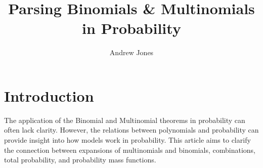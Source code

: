 \documentclass{article}
\title{Parsing Binomials \& Multinomials in Probability}
\author{Andrew Jones}\date{}
\theoremstyle{plain}
\theoremstyle{definition}
\theoremstyle{remark}
\begin{document}
\maketitle



\section*{Introduction}

The application of the Binomial and Multinomial theorems in probability can often lack clarity. However, the relations between polynomials and probability can provide insight into how models work in probability. This article aims to clarify the connection between expansions of multinomials and binomials, combinations, total probability, and probability mass functions.

\end{document}
